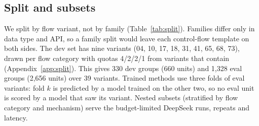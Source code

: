 \subsection{Split and subsets}
\label{sec:split}
We split by flow variant, not by family (Table~\ref{tab:split}).
Families differ only in data type and API, so a family split would leave each control-flow template on both sides.
The dev set has nine variants (04, 10, 17, 18, 31, 41, 65, 68, 73), drawn per flow category with quotas 4/2/2/1 from variants that contain  (Appendix~\ref{app:split}). %
This gives 330 dev groups (660 units) and 1,328 eval groups (2,656 units) over 39 variants.
Trained methods use three folds of eval variants: fold $k$ is predicted by a model trained on the other two, so no eval unit is scored by a model that saw its variant.
Nested subsets (stratified by flow category and mechanism) serve the budget-limited DeepSeek runs, repeats and latency.


